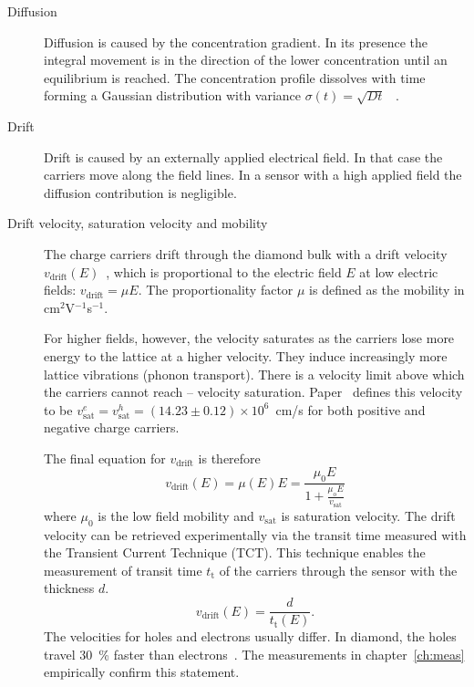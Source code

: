 \begin{description}

\item[Diffusion]
Diffusion is caused by the concentration gradient. In its presence the integral movement is in the direction of the lower concentration until an equilibrium is reached.
The concentration profile dissolves with time forming a Gaussian distribution with variance $\sigma(t)=\sqrt{Dt}$~\cite{} .

\item[Drift]
Drift is caused by an externally applied electrical field. In that case the carriers move along the field lines. In a sensor with a high applied field the diffusion contribution is negligible. 

\item[Drift velocity, saturation velocity and mobility]
The charge carriers drift through the diamond bulk with a drift velocity $v_\mathrm{drift}(E)$~\cite{}, which is proportional to the electric field $E$ at low electric fields: $v_\mathrm{drift} = \mu E$. The proportionality factor $\mu$ is defined as the mobility in cm$^2$V$^{-1}$s$^{-1}$.

For higher fields, however, the velocity saturates as the carriers lose more energy to the lattice at a higher velocity. They induce increasingly more lattice vibrations (phonon transport). There is a velocity limit above which the carriers cannot reach -- velocity saturation. Paper~\cite{} defines this velocity to be $v^e_\mathrm{sat}=v^h_\mathrm{sat}=(14.23\pm0.12)\times10^6$~cm/s for both positive and negative charge carriers.

The final equation for $v_\mathrm{drift}$ is therefore
\begin{equation}
\label{eq:vsat}
v_\mathrm{drift}(E) = \mu(E)E= \frac{\mu_\mathrm{0} E}{1 + \frac{\mu_\mathrm{o} E}{v_\mathrm{sat}}}
\end{equation}
where $\mu_\mathrm{0}$ is the low field mobility and $v_\mathrm{sat}$ is saturation velocity. The drift velocity can be retrieved experimentally via the transit time measured with the Transient Current Technique (TCT). This technique enables the measurement of transit time $t_\mathrm{t}$ of the carriers through the sensor with the thickness $d$. 
\begin{equation}
\label{eq:vsat}
v_\mathrm{drift}(E) = \frac{d}{t_\mathrm{t}(E)}.
\end{equation}
The velocities for holes and electrons usually differ. In diamond, the holes travel 30~\% faster than electrons~\cite{}. The measurements in chapter~\ref{ch:meas} empirically confirm this statement.


\end{description}
